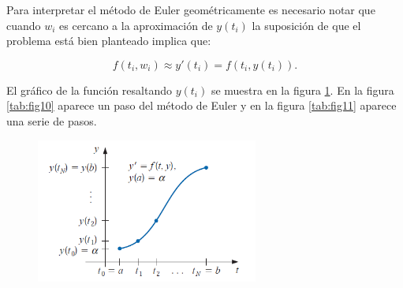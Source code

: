 Para interpretar el método de Euler geométricamente es necesario notar que cuando $w_i$ es cercano a la aproximación de $y(t_i)$ la suposición de que el problema está bien planteado implica que:

\begin{equation*}
    f(t_i,w_i)\approx y'(t_i)=f(t_i,y(t_i)).
\end{equation*}

El gráfico de la función resaltando $y(t_i)$ se muestra en la figura \ref{tab:fig9}. En la figura \ref{tab:fig10} aparece un paso del método de Euler y en la figura \ref{tab:fig11} aparece una serie de pasos. 

\begin{figure}[h!]
\centering
  \includegraphics[width=0.65\textwidth]{Euler1.png}
\caption{}
\label{tab:fig9}
\end{figure} 


